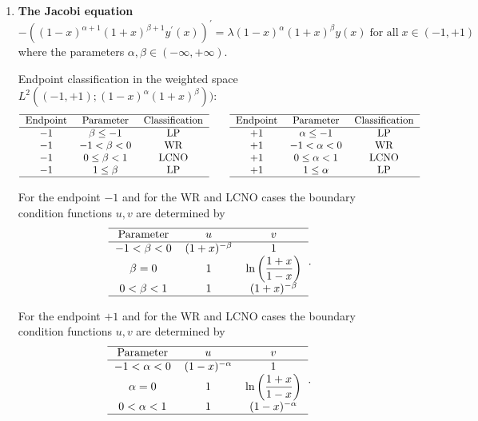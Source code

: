 \documentclass[12pt]{amsart}%
\theoremstyle{plain}
\numberwithin{equation}{section}
\begin{document}
\begin{enumerate}
\item \textbf{The Jacobi equation}%
\[
-\left(  (1-x)^{\alpha+1}(1+x)^{\beta+1}y^{\prime}(x)\right)  ^{\prime
}=\lambda(1-x)^{\alpha}(1+x)^{\beta}y(x)\;\text{for all}\;x\in(-1,+1)
\]
where the parameters $\alpha,\beta\in(-\infty,+\infty).$

Endpoint classification in the weighted space $L^{2}((-1,+1);(1-x)^{\alpha
}(1+x)^{\beta}))$:%
\[%
\begin{tabular}
[c]{ccc}\hline
Endpoint & Parameter & Classification\\\hline
$-1$ & $\beta\leq-1$ & LP\\
$-1$ & $-1<\beta<0$ & WR\\
$-1$ & $0\leq\beta<1$ & LCNO\\
$-1$ & $1\leq\beta$ & LP\\\hline
\end{tabular}
\quad\quad%
\begin{tabular}
[c]{ccc}\hline
Endpoint & Parameter & Classification\\\hline
$+1$ & $\alpha\leq-1$ & LP\\
$+1$ & $-1<\alpha<0$ & WR\\
$+1$ & $0\leq\alpha<1$ & LCNO\\
$+1$ & $1\leq\alpha$ & LP\\\hline
\end{tabular}
\]

For the endpoint $-1$ and for the WR and LCNO cases the boundary condition
functions $u,v$ are determined by%
\[%
\begin{tabular}
[c]{ccc}\hline
Parameter & $u$ & $v$\\\hline
$-1<\beta<0$ & $(1+x)^{-\beta}$ & $1$\\
$\beta=0$ & $1$ & $\ln\left(  \dfrac{1+x}{1-x}\right)  $\\
$0<\beta<1$ & $1$ & $(1+x)^{-\beta}$\\\hline
\end{tabular}
.
\]

For the endpoint $+1$ and for the WR and LCNO cases the boundary condition
functions $u,v$ are determined by%
\[%
\begin{tabular}
[c]{ccc}\hline
Parameter & $u$ & $v$\\\hline
$-1<\alpha<0$ & $(1-x)^{-\alpha}$ & $1$\\
$\alpha=0$ & $1$ & $\ln\left(  \dfrac{1+x}{1-x}\right)  $\\
$0<\alpha<1$ & $1$ & $(1-x)^{-\alpha}$\\\hline
\end{tabular}
.
\]


\end{enumerate}
\end{document}
